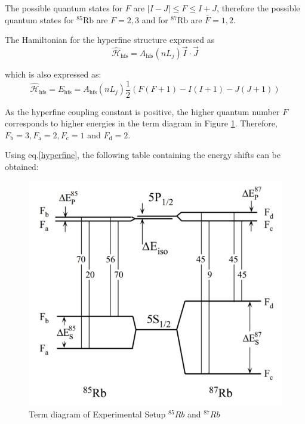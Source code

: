 \documentclass[12pt]{article}
\begin{document}
The possible quantum states for $F$ are $|I-J| \leq F \leq I+J$, therefore the possible quantum states for ${ }^{85} \mathrm{Rb}$ are $F=2,3$ and for ${ }^{87} \mathrm{Rb}$ are $\bar{F}=1,2$.

The Hamiltonian for the hyperfine structure expressed as
$$
\hat{\mathcal{H}}_{\mathrm{hfs}}=A_{\mathrm{hfs}}\left(n L_j\right) \vec{I} \cdot \vec{J}
$$

which is also expressed as:
\begin{equation}
    \hat{\mathcal{H}}_{\mathrm{hfs}}=E_{\mathrm{hfs}}=A_{\mathrm{hfs}}\left(n L_j\right) \frac{1}{2}(F(F+1)-I(I+1)-J(J+1))
    \label{hyperfine}
\end{equation}

As the hyperfine coupling constant is positive, the higher quantum number $F$ corresponds to higher energies in the term diagram in Figure \ref{fig6}. Therefore, $F_{\mathrm{b}}=3, F_{\mathrm{a}}=2, F_{\mathrm{c}}=1$ and $F_{\mathrm{d}}=2$.

Using eq.\ref{hyperfine}, the following table containing the energy shifts can be obtained:
\\


\begin{figure}[H]
    \centering
    \includegraphics[width = \textwidth]{fig/Term diagram.jpg}
    \caption{Term diagram of Experimental Setup $^{85}Rb$ and $^{87}Rb$ \cite{lecturenote}}
    \label{fig6}
\end{figure}
\end{document}
